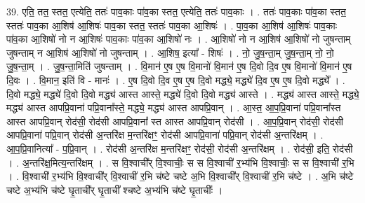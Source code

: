 \documentclass[17pt]{extarticle}
\begin{document}
39. एति॒ तत॒ स्तत॒ एत्येति॒ ततः॑ पाव॒काः पा॑व॒का स्तत॒ एत्येति॒ ततः॑ पाव॒काः । . ततः॑ पाव॒काः पा॑व॒का स्तत॒ स्ततः॑ पाव॒का आ॒शिष॑ आ॒शिषः॑ पाव॒का स्तत॒ स्ततः॑ पाव॒का आ॒शिषः॑ । . पा॒व॒का आ॒शिष॑ आ॒शिषः॑ पाव॒काः पा॑व॒का आ॒शिषो॑ नो न आ॒शिषः॑ पाव॒काः पा॑व॒का आ॒शिषो॑ नः । . आ॒शिषो॑ नो न आ॒शिष॑ आ॒शिषो॑ नो जुषन्ताम् जुषन्ताम् न आ॒शिष॑ आ॒शिषो॑ नो जुषन्ताम् । . आ॒शिष॒ इत्या᳚ - शिषः॑ । . नो॒ जु॒ष॒न्ता॒म् जु॒ष॒न्ता॒म् नो॒ नो॒ जु॒ष॒न्ता॒म् । . जु॒ष॒न्ता॒मिति॑ जुषन्ताम् । . वि॒मान॑ ए॒ष ए॒ष वि॒मानो॑ वि॒मान॑ ए॒ष दि॒वो दि॒व ए॒ष वि॒मानो॑ वि॒मान॑ ए॒ष दि॒वः । . वि॒मान॒ इति॑ वि - मानः॑ । . ए॒ष दि॒वो दि॒व ए॒ष ए॒ष दि॒वो मद्ध्ये॒ मद्ध्ये॑ दि॒व ए॒ष ए॒ष दि॒वो मद्ध्ये᳚ । . दि॒वो मद्ध्ये॒ मद्ध्ये॑ दि॒वो दि॒वो मद्ध्य॑ आस्त आस्ते॒ मद्ध्ये॑ दि॒वो दि॒वो मद्ध्य॑ आस्ते । . मद्ध्य॑ आस्त आस्ते॒ मद्ध्ये॒ मद्ध्य॑ आस्त आपप्रि॒वाना॑ पप्रि॒वाना᳚स्ते॒ मद्ध्ये॒ मद्ध्य॑ आस्त आपप्रि॒वान् । . आ॒स्त॒ आ॒प॒प्रि॒वाना॑ पप्रि॒वाना᳚स्त आस्त आपप्रि॒वान् रोद॑सी॒ रोद॑सी आपप्रि॒वाना᳚ स्त आस्त आपप्रि॒वान् रोद॑सी । . आ॒प॒प्रि॒वान् रोद॑सी॒ रोद॑सी आपप्रि॒वाना॑ पप्रि॒वान् रोद॑सी अ॒न्तरि॑क्ष म॒न्तरि॑क्षꣳ॒॒ रोद॑सी 
आपप्रि॒वाना॑ पप्रि॒वान् रोद॑सी अ॒न्तरि॑क्षम् । . आ॒प॒प्रि॒वानित्या᳚ - प॒प्रि॒वान् । . रोद॑सी अ॒न्तरि॑क्ष म॒न्तरि॑क्षꣳ॒॒ रोद॑सी॒ रोद॑सी अ॒न्तरि॑क्षम् । . रोद॑सी॒ इति॒ रोद॑सी । . अ॒न्तरि॑क्ष॒मित्य॒न्तरि॑क्षम् । . स वि॒श्वाची᳚र् वि॒श्वाचीः॒ स स वि॒श्वाची॑ र॒भ्य॑भि वि॒श्वाचीः॒ स स वि॒श्वाची॑ र॒भि । . वि॒श्वाची॑ र॒भ्य॑भि वि॒श्वाची᳚र् वि॒श्वाची॑ र॒भि च॑ष्टे चष्टे अ॒भि वि॒श्वाची᳚र् वि॒श्वाची॑ र॒भि च॑ष्टे । . अ॒भि च॑ष्टे चष्टे अ॒भ्य॑भि च॑ष्टे घृ॒ताची᳚र् घृ॒ताची᳚ श्चष्टे अ॒भ्य॑भि च॑ष्टे घृ॒ताचीः᳚ । \newline
\pagebreak
{}
\end{document}
